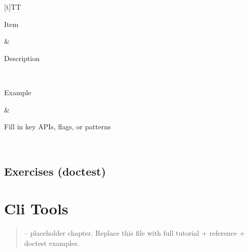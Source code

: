 \documentclass[a4paper,11pt,english]{sphinxmanual}
\begin{document}
\begin{savenotes}\sphinxattablestart
\sphinxthistablewithglobalstyle
\centering
\begin{tabulary}{\linewidth}[t]{TT}
\sphinxtoprule
\begin{varwidth}[t]{}
\sphinxstyletheadfamily \sphinxAtStartPar
Item
\sphinxbeforeendvarwidth
\end{varwidth}%
&\begin{varwidth}[t]{}
\sphinxstyletheadfamily \sphinxAtStartPar
Description
\sphinxbeforeendvarwidth
\end{varwidth}%
\\
\sphinxmidrule
\sphinxtableatstartofbodyhook\begin{varwidth}[t]{}
\sphinxAtStartPar
Example
\sphinxbeforeendvarwidth
\end{varwidth}%
&\begin{varwidth}[t]{}
\sphinxAtStartPar
Fill in key APIs, flags, or patterns
\sphinxbeforeendvarwidth
\end{varwidth}%
\\
\sphinxbottomrule
\end{tabulary}
\sphinxtableafterendhook\par
\sphinxattableend\end{savenotes}


\subsection{Exercises (doctest)}
\label{\detokenize{stdlib/text_processing:exercises-doctest}}
\begin{sphinxVerbatim}[commandchars=\\\{\}]
\end{sphinxVerbatim}

\sphinxstepscope


\section{Cli Tools}
\label{\detokenize{third_party/cli_tools:cli-tools}}\label{\detokenize{third_party/cli_tools::doc}}\begin{quote}

\sphinxAtStartPar
{} – placeholder chapter. Replace this file with full tutorial + reference + doctest examples.
\end{quote}
\end{document}
